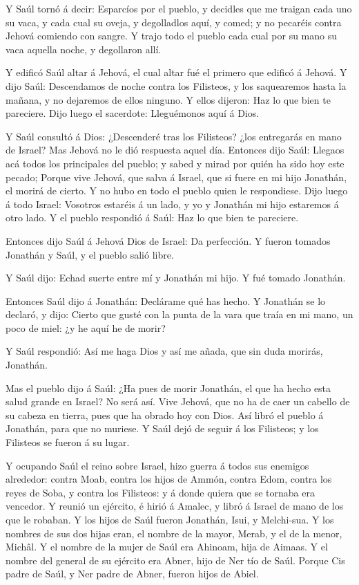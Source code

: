  Y Saúl tornó á decir: Esparcíos por el pueblo, y decidles
que me traigan cada uno su vaca, y cada cual su oveja, y degolladlos
aquí, y comed; y no pecaréis contra Jehová comiendo con sangre. Y trajo
todo el pueblo cada cual por su mano su vaca aquella noche, y degollaron
allí.

 Y edificó Saúl altar á Jehová, el cual altar fué el
primero que edificó á Jehová.  Y dijo Saúl: Descendamos de
noche contra los Filisteos, y los saquearemos hasta la mañana, y no
dejaremos de ellos ninguno. Y ellos dijeron: Haz lo que bien te
pareciere. Dijo luego el sacerdote: Lleguémonos aquí á Dios.

 Y Saúl consultó á Dios: ¿Descenderé tras los Filisteos?
¿los entregarás en mano de Israel? Mas Jehová no le dió respuesta aquel
día.  Entonces dijo Saúl: Llegaos acá todos los principales
del pueblo; y sabed y mirad por quién ha sido hoy este pecado;
 Porque vive Jehová, que salva á Israel, que si fuere en mi
hijo Jonathán, el morirá de cierto. Y no hubo en todo el pueblo quien le
respondiese.  Dijo luego á todo Israel: Vosotros estaréis á
un lado, y yo y Jonathán mi hijo estaremos á otro lado. Y el pueblo
respondió á Saúl: Haz lo que bien te pareciere.

 Entonces dijo Saúl á Jehová Dios de Israel: Da perfección.
Y fueron tomados Jonathán y Saúl, y el pueblo salió libre.

 Y Saúl dijo: Echad suerte entre mí y Jonathán mi hijo. Y
fué tomado Jonathán.

 Entonces Saúl dijo á Jonathán: Declárame qué has hecho. Y
Jonathán se lo declaró, y dijo: Cierto que gusté con la punta de la vara
que traía en mi mano, un poco de miel: ¿y he aquí he de morir?

 Y Saúl respondió: Así me haga Dios y así me añada, que sin
duda morirás, Jonathán.

 Mas el pueblo dijo á Saúl: ¿Ha pues de morir Jonathán, el
que ha hecho esta salud grande en Israel? No será así. Vive Jehová, que
no ha de caer un cabello de su cabeza en tierra, pues que ha obrado hoy
con Dios. Así libró el pueblo á Jonathán, para que no muriese.
 Y Saúl dejó de seguir á los Filisteos; y los Filisteos se
fueron á su lugar.

 Y ocupando Saúl el reino sobre Israel, hizo guerra á todos
sus enemigos alrededor: contra Moab, contra los hijos de Ammón, contra
Edom, contra los reyes de Soba, y contra los Filisteos: y á donde quiera
que se tornaba era vencedor.  Y reunió un ejército, é hirió
á Amalec, y libró á Israel de mano de los que le robaban. 
Y los hijos de Saúl fueron Jonathán, Isui, y Melchi-sua. Y los nombres
de sus dos hijas eran, el nombre de la mayor, Merab, y el de la menor,
Michâl.  Y el nombre de la mujer de Saúl era Ahinoam, hija
de Aimaas. Y el nombre del general de su ejército era Abner, hijo de Ner
tío de Saúl.  Porque Cis padre de Saúl, y Ner padre de
Abner, fueron hijos de Abiel.

